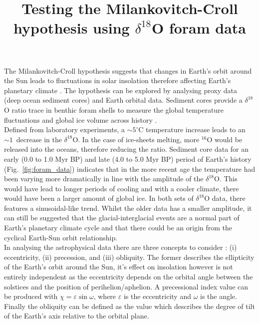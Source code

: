 \documentclass[12pt, onecolumn]{revtex4}    %
\begin{document}
                     

\title{Testing the Milankovitch-Croll hypothesis using $\delta^{18}$O foram data} 
\maketitle

\vspace{-4ex}

The Milankovitch-Croll hypothesis suggests that changes in Earth's orbit around the Sun leads to fluctuations in solar insolation therefore affecting Earth's planetary climate \cite{ruddiman_climate}. The hypothesis can be explored by analysing proxy data (deep ocean sediment cores) and Earth orbital data. Sediment cores provide a $\delta^{18}$O ratio trace in benthic foram shells to measure the global temperature fluctuations and global ice volume across history \cite{droxler_climate}. \\


Defined from laboratory experiments, a $\sim 5^{\circ}\mathrm{C}$ temperature increase leads to an $\sim 1$\textperthousand\ decrease in the $\delta^{18}$O. In the case of ice-sheets melting, more $^{16}$O would be released into the oceans, therefore reducing the ratio. Sediment core data for an early (0.0 to 1.0 Myr BP) and late (4.0 to 5.0 Myr BP) period of Earth's history (Fig.~\ref{fig:foram_data}) indicates that in the more recent age the temperature had been varying more dramatically in line with the amplitude of the $\delta^{18}$O. This would have lead to longer periods of cooling and with a cooler climate, there would have been a larger amount of global ice. In both sets of $\delta^{18}$O data, there features a sinusoidal-like trend. Whilst the older data has a smaller amplitude, it can still be suggested that the glacial-interglacial events are a normal part of Earth's planetary climate cycle and that there could be an origin from the cyclical Earth-Sun orbit relationship. \\

In analysing the astrophysical data there are three concepts to consider \cite{ruddiman_climate}: (i) eccentricity, (ii) precession, and (iii) obliquity. The former describes the ellipticity of the Earth's orbit around the Sun, it's effect on insolation however is not entirely independent as the eccentricity depends on the orbital angle between the solstices and the position of perihelion/aphelion. A precessional index value can be produced with $\chi= \varepsilon \sin{\omega}$, where $\varepsilon$ is the eccentricity and $\omega$ is the angle. Finally the obliquity can be defined as the value which describes the degree of tilt of the Earth's axis relative to the orbital plane.  \\
\end{document}

